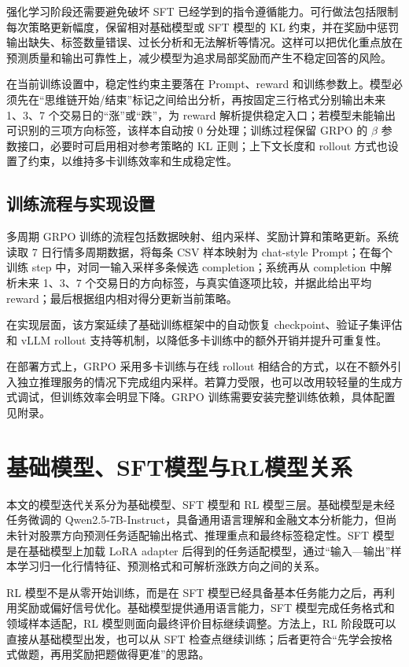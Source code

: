强化学习阶段还需要避免破坏 SFT 已经学到的指令遵循能力。可行做法包括限制每次策略更新幅度，保留相对基础模型或 SFT 模型的 KL 约束，并在奖励中惩罚输出缺失、标签数量错误、过长分析和无法解析等情况。这样可以把优化重点放在预测质量和输出可靠性上，减少模型为追求局部奖励而产生不稳定回答的风险。

在当前训练设置中，稳定性约束主要落在 Prompt、reward 和训练参数上。模型必须先在“思维链开始/结束”标记之间给出分析，再按固定三行格式分别输出未来 1、3、7 个交易日的“涨”或“跌”，为 reward 解析提供稳定入口；若模型未能输出可识别的三项方向标签，该样本自动按 0 分处理；训练过程保留 GRPO 的 \(\beta\) 参数接口，必要时可启用相对参考策略的 KL 正则；上下文长度和 rollout 方式也设置了约束，以维持多卡训练效率和生成稳定性。

\subsection{训练流程与实现设置}

多周期 GRPO 训练的流程包括数据映射、组内采样、奖励计算和策略更新。系统读取 7 日行情多周期数据，将每条 CSV 样本映射为 chat-style Prompt；在每个训练 step 中，对同一输入采样多条候选 completion；系统再从 completion 中解析未来 1、3、7 个交易日的方向标签，与真实值逐项比较，并据此给出平均 reward；最后根据组内相对得分更新当前策略。

在实现层面，该方案延续了基础训练框架中的自动恢复 checkpoint、验证子集评估和 vLLM rollout 支持等机制，以降低多卡训练中的额外开销并提升可重复性。

在部署方式上，GRPO 采用多卡训练与在线 rollout 相结合的方式，以在不额外引入独立推理服务的情况下完成组内采样。若算力受限，也可以改用较轻量的生成方式调试，但训练效率会明显下降。GRPO 训练需要安装完整训练依赖，具体配置见附录。

\section{基础模型、SFT模型与RL模型关系}

本文的模型迭代关系分为基础模型、SFT 模型和 RL 模型三层。基础模型是未经任务微调的 Qwen2.5-7B-Instruct，具备通用语言理解和金融文本分析能力，但尚未针对股票方向预测任务适配输出格式、推理重点和最终标签稳定性。SFT 模型是在基础模型上加载 LoRA adapter 后得到的任务适配模型，通过“输入—输出”样本学习归一化行情特征、预测格式和可解析涨跌方向之间的关系。

RL 模型不是从零开始训练，而是在 SFT 模型已经具备基本任务能力之后，再利用奖励或偏好信号优化。基础模型提供通用语言能力，SFT 模型完成任务格式和领域样本适配，RL 模型则面向最终评价目标继续调整。方法上，RL 阶段既可以直接从基础模型出发，也可以从 SFT 检查点继续训练；后者更符合“先学会按格式做题，再用奖励把题做得更准”的思路。

